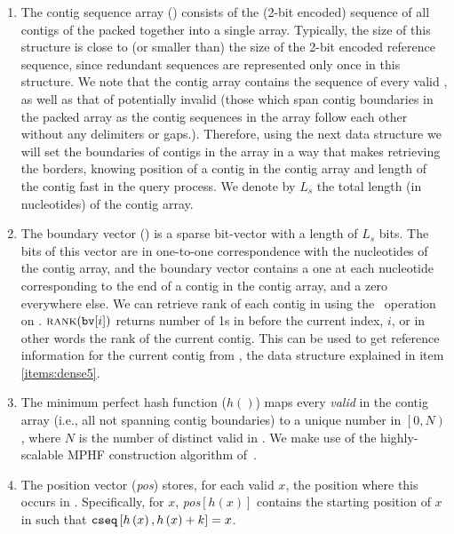 \begin{enumerate}

\item The contig sequence array (\cseq) consists of the (2-bit encoded) sequence of all
  contigs of the \ccdbg packed together into a single array. Typically, the size
  of this structure is close to (or smaller than) the size of the 2-bit encoded
  reference sequence, since redundant sequences are represented only once in
  this structure. We note that the contig array contains the sequence of every
  valid \kmer, as well as that of potentially invalid \kmers (those which span
  contig boundaries in the packed array as the contig sequences in the array follow each other without any delimiters or gaps.).
  Therefore, using the next data structure we will set the boundaries of contigs in the array in a way that makes retrieving the borders, knowing position of a contig in the contig array and length of the contig fast in the query process. 
  We denote by $L_s$ the total length (in
  nucleotides) of the contig array.

\item The boundary vector (\bv) is a sparse bit-vector with a length of $L_s$
  bits. The bits of this vector are in one-to-one correspondence with the
  nucleotides of the contig array, and the boundary vector contains a one at
  each nucleotide corresponding to the end of a contig in the contig array, and
  a zero everywhere else. We can retrieve rank of each contig in \cseq using the
  \rank~operation on \bv. $\mbox{\sc rank}(\texttt{bv}[i])$ returns number of 1s in \bv before the current index, $i$, or in other words the rank of the current contig. This can be used to get reference information for the current contig from \ctab, the data structure explained in item \ref{items:dense5}.

\item The minimum perfect hash function ($h\left(\right)$) maps every
  \emph{valid} \kmer in the contig array (i.e., all \kmers not spanning contig
  boundaries) to a unique number in $\left[0,N\right)$, where $N$ is the number
    of distinct valid \kmers in \cseq. We make use of the highly-scalable MPHF
    construction algorithm of~\cite{limasset2017fast}.

\item The position vector (\emph{pos}) stores, for each valid \kmer $x$, the
  position where this \kmer occurs in \cseq. Specifically, for \kmer $x$,
  \emph{pos}$\left[h\left(x\right)\right]$ contains the starting position of $x$ in \cseq 
  such that $\texttt{cseq}\left[h\left(x\right),h\left(x\right) + k\right] = x$.


\end{enumerate}
